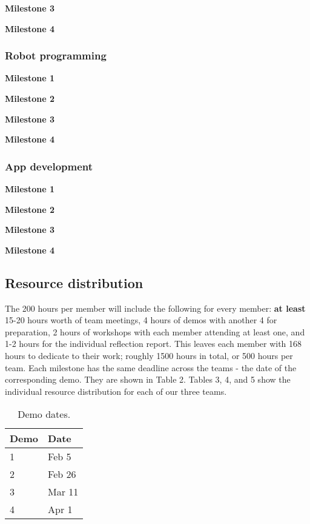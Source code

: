 \documentclass{article}
\begin{document}
{\bf Milestone 3}

{\bf Milestone 4}


\subsubsection{Robot programming}

{\bf Milestone 1}

{\bf Milestone 2}

{\bf Milestone 3}

{\bf Milestone 4}

\subsubsection{App development}

{\bf Milestone 1}

{\bf Milestone 2}

{\bf Milestone 3}

{\bf Milestone 4}


\subsection{Resource distribution}

The 200 hours per member will include the following for every member: {\bf at least} 15-20 hours worth of team meetings, 4 hours of demos with another 4 for preparation, 2 hours of workshops with each member attending at least one, and 1-2 hours for the individual reflection report. This leaves each member with 168 hours to dedicate to their work; roughly 1500 hours in total, or 500 hours per team. Each milestone has the same deadline across the teams - the date of the corresponding demo. They are shown in Table 2. Tables 3, 4, and 5 show the individual resource distribution for each of our three teams.
\begin{table}[]
  \begin{center}
  \begin{tabular}{ll}
    \hline
    Demo & Date   \\
    \hline
    1 & Feb 5 \\
    2 & Feb 26 \\
    3 & Mar 11 \\
    4 & Apr 1\\ \hline
  \end{tabular}
  \end{center}
  \caption{Demo dates.}
\end{table}
\end{document}
